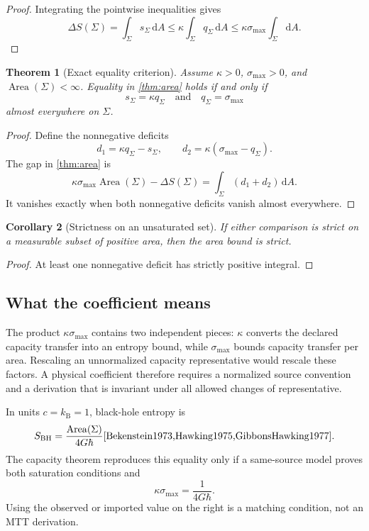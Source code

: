 \documentclass[11pt,a4paper]{article}
\numberwithin{equation}{section}
\newtheorem{theorem}{Theorem}[section]
\newtheorem{corollary}[theorem]{Corollary}
\theoremstyle{definition}
\theoremstyle{remark}
\newcommand{\dd}{\mathrm{d}}
\begin{document}
\begin{proof}
Integrating the pointwise inequalities gives
\[
  \Delta S(\Sigma)
  =
  \int_\Sigma s_\Sigma\,\dd A
  \leq
  \kappa\int_\Sigma q_\Sigma\,\dd A
  \leq
  \kappa\sigma_{\max}\int_\Sigma\dd A.
\]
\end{proof}

\begin{theorem}[Exact equality criterion]
\label{thm:equality}
Assume \(\kappa>0\), \(\sigma_{\max}>0\), and
\(\operatorname{Area}(\Sigma)<\infty\).  Equality in
\cref{thm:area} holds if and only if
\[
  s_\Sigma=\kappa q_\Sigma
  \quad\text{and}\quad
  q_\Sigma=\sigma_{\max}
\]
almost everywhere on \(\Sigma\).
\end{theorem}

\begin{proof}
Define the nonnegative deficits
\[
  d_1=\kappa q_\Sigma-s_\Sigma,
  \qquad
  d_2=\kappa(\sigma_{\max}-q_\Sigma).
\]
The gap in \cref{thm:area} is
\[
  \kappa\sigma_{\max}\operatorname{Area}(\Sigma)
  -\Delta S(\Sigma)
  =
  \int_\Sigma(d_1+d_2)\,\dd A.
\]
It vanishes exactly when both nonnegative deficits vanish almost
everywhere.
\end{proof}

\begin{corollary}[Strictness on an unsaturated set]
If either comparison is strict on a measurable subset of positive area,
then the area bound is strict.
\end{corollary}

\begin{proof}
At least one nonnegative deficit has strictly positive integral.
\end{proof}

\subsection{What the coefficient means}

The product \(\kappa\sigma_{\max}\) contains two independent pieces:
\(\kappa\) converts the declared capacity transfer into an entropy bound,
while \(\sigma_{\max}\) bounds capacity transfer per area.  Rescaling an
unnormalized capacity representative would rescale these factors.  A
physical coefficient therefore requires a normalized source convention
and a derivation that is invariant under all allowed changes of
representative.

In units \(c=k_{\mathrm B}=1\), black-hole entropy is
\[
  S_{\mathrm{BH}}
  =
  \frac{\operatorname{Area}(\Sigma)}{4G\hbar}
  \cite{Bekenstein1973,Hawking1975,GibbonsHawking1977}.
\]
The capacity theorem reproduces this equality only if a same-source model
proves both saturation conditions and
\[
  \kappa\sigma_{\max}=\frac{1}{4G\hbar}.
\]
Using the observed or imported value on the right is a matching
condition, not an MTT derivation.
\end{document}
